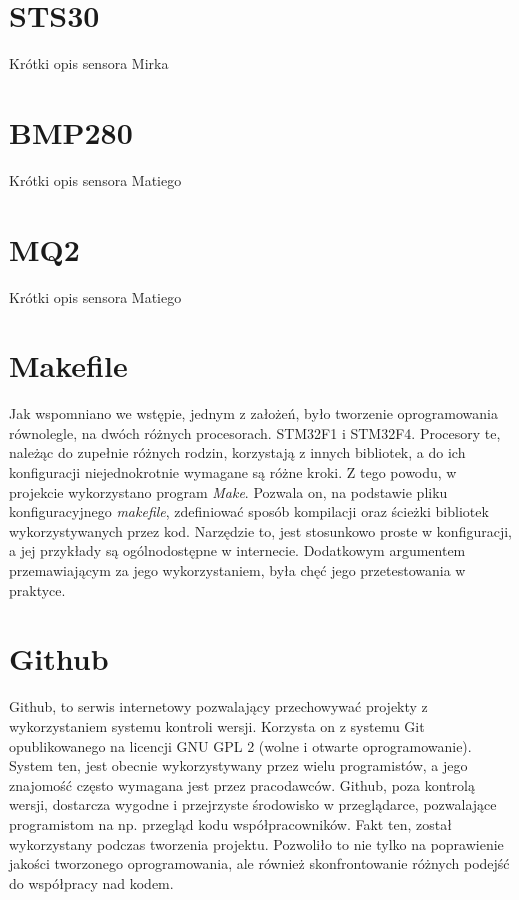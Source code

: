 \section{STS30}

Krótki opis sensora Mirka

\section{BMP280}

Krótki opis sensora Matiego

\section{MQ2}

Krótki opis sensora Matiego

\section{Makefile}
Jak wspomniano we wstępie, jednym z założeń, było tworzenie oprogramowania równolegle, na dwóch różnych procesorach. STM32F1 i STM32F4. Procesory te, należąc do zupełnie różnych rodzin, korzystają z innych bibliotek, a do ich konfiguracji niejednokrotnie wymagane są różne kroki. Z tego powodu, w projekcie wykorzystano program \emph{Make}. Pozwala on, na podstawie pliku konfiguracyjnego \emph{makefile}, zdefiniować sposób kompilacji oraz ścieżki bibliotek wykorzystywanych przez kod. Narzędzie to, jest stosunkowo proste w konfiguracji, a jej przykłady są ogólnodostępne w internecie. Dodatkowym argumentem przemawiającym za jego wykorzystaniem, była chęć jego przetestowania w praktyce.

\section{Github}
Github, to serwis internetowy pozwalający przechowywać projekty z wykorzystaniem systemu kontroli wersji. Korzysta on z systemu Git opublikowanego na licencji GNU GPL 2 (wolne i otwarte oprogramowanie). System ten, jest obecnie wykorzystywany przez wielu programistów, a jego znajomość często wymagana jest przez pracodawców. Github, poza kontrolą wersji, dostarcza wygodne i przejrzyste środowisko w przeglądarce, pozwalające programistom na np. przegląd kodu współpracowników. Fakt ten, został wykorzystany podczas tworzenia projektu. Pozwoliło to nie tylko na poprawienie jakości tworzonego oprogramowania, ale również skonfrontowanie różnych podejść do współpracy nad kodem.